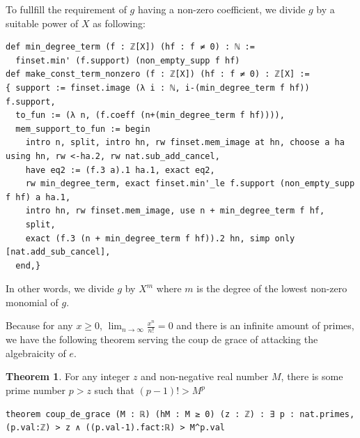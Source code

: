 \documentclass{report}
\theoremstyle{definition}
\newtheorem{theorem}{Theorem}[section]
\newenvironment{code}{\captionsetup{type=listing}}{}
\begin{document}
To fullfill the requirement of $g$ having a non-zero coefficient, we divide $g$ by a suitable power of $X$ as following:
\begin{code}
\begin{verbatim}
def min_degree_term (f : ℤ[X]) (hf : f ≠ 0) : ℕ := 
  finset.min' (f.support) (non_empty_supp f hf)
def make_const_term_nonzero (f : ℤ[X]) (hf : f ≠ 0) : ℤ[X] := 
{ support := finset.image (λ i : ℕ, i-(min_degree_term f hf)) f.support,
  to_fun := (λ n, (f.coeff (n+(min_degree_term f hf)))),
  mem_support_to_fun := begin
    intro n, split, intro hn, rw finset.mem_image at hn, choose a ha using hn, rw <-ha.2, rw nat.sub_add_cancel,
    have eq2 := (f.3 a).1 ha.1, exact eq2,
    rw min_degree_term, exact finset.min'_le f.support (non_empty_supp f hf) a ha.1,
    intro hn, rw finset.mem_image, use n + min_degree_term f hf,
    split,
    exact (f.3 (n + min_degree_term f hf)).2 hn, simp only [nat.add_sub_cancel],
  end,}
\end{verbatim}

In other words, we divide $g$ by $X^m$ where $m$ is the degree of the lowest non-zero monomial of $g$.
\end{code}

Because for any $x\ge 0$, $\lim_{n\to\infty}\frac{x^n}{n!}=0$ and there is an infinite amount of primes, we have the following theorem serving the coup de grace of attacking the algebraicity of $e$.
\begin{theorem}
For any integer $z$ and non-negative real number $M$, there is some prime number $p>z$ such that $(p-1)!>M^p$
\begin{verbatim}
theorem coup_de_grace (M : ℝ) (hM : M ≥ 0) (z : ℤ) : ∃ p : nat.primes, (p.val:ℤ) > z ∧ ((p.val-1).fact:ℝ) > M^p.val
\end{verbatim} 
\end{theorem}
\end{document}
